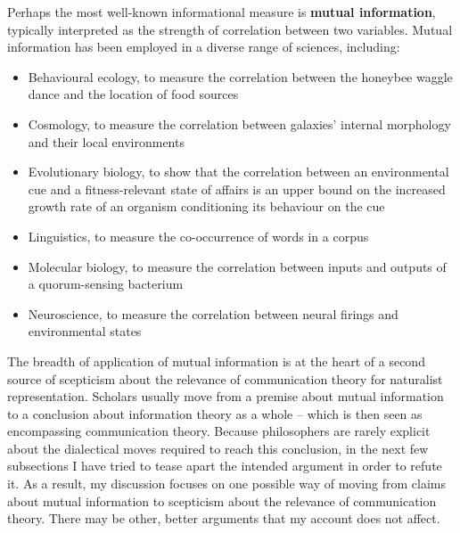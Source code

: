\documentclass[12pt]{article}
\begin{document}


Perhaps the most well-known informational measure is \textbf{mutual information}, typically interpreted as the strength of correlation between two variables.
Mutual information has been employed in a diverse range of sciences, including:

\begin{itemize}
    \item Behavioural ecology, to measure the correlation between the honeybee waggle dance and the location of food sources \citep{haldane1954statistical}
    \item Cosmology, to measure the correlation between galaxies' internal morphology and their local environments \citep{pandey2017how}
    \item Evolutionary biology, to show that the correlation between an environmental cue and a fitness-relevant state of affairs is an upper bound on the increased growth rate of an organism conditioning its behaviour on the cue \citep{donaldson-matasci2010fitness}
    \item Linguistics, to measure the co-occurrence of words in a corpus \citep[$\S$4]{hunston2002corpora}
    \item Molecular biology, to measure the correlation between inputs and outputs of a quorum-sensing bacterium \citep{mehta2009information}
    \item Neuroscience, to measure the correlation between neural firings and environmental states \citep[][and references therein]{rathkopf2017neural}
\end{itemize}

\noindent The breadth of application of mutual information is at the heart of a second source of scepticism about the relevance of communication theory for naturalist representation.
Scholars usually move from a premise about mutual information to a conclusion about information theory as a whole -- which is then seen as encompassing communication theory.
Because philosophers are rarely explicit about the dialectical moves required to reach this conclusion, in the next few subsections I have tried to tease apart the intended argument in order to refute it.
As a result, my discussion focuses on one possible way of moving from claims about mutual information to scepticism about the relevance of communication theory.
There may be other, better arguments that my account does not affect.

\end{document}
